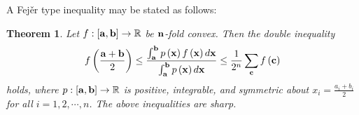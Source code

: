 \documentclass{amsart}
\newtheorem{theorem}{Theorem}
\theoremstyle{plain}
\numberwithin{equation}{section}
\begin{document}
A Fej\v{e}r type inequality may be stated as follows:
\begin{theorem}
\label{thm3} Let $f:\left[ {{\bf{a}},{\bf{b}}} \right] \to
\mathbb{R}$ be ${\bf{n}}$-fold convex. Then the double inequality
\begin{align}
\label{fejer}f\left( {\frac{{{\bf{a}} + {\bf{b}}}}{2}} \right)\le
\frac{\int_{\bf{a}}^{\bf{b}} {p\left( {\bf{x}} \right)f\left(
{\bf{x}} \right)d{\bf{x}}}}{\int_{\bf{a}}^{\bf{b}} {p\left(
{\bf{x}} \right)d{\bf{x}}}} \le \frac{1}{{2^n
}}\sum\limits_{\bf{c}} {f\left( {\bf{c}} \right)}
\end{align}
holds, where $p:\left[ {{\bf{a}},{\bf{b}}} \right]\to \mathbb{R}$
is positive, integrable, and symmetric about $x_i = \frac{{a_i +
b_i}}{2}$ for all $i=1,2,\cdots, n$. The above inequalities are
sharp.
\end{theorem}
\end{document}
